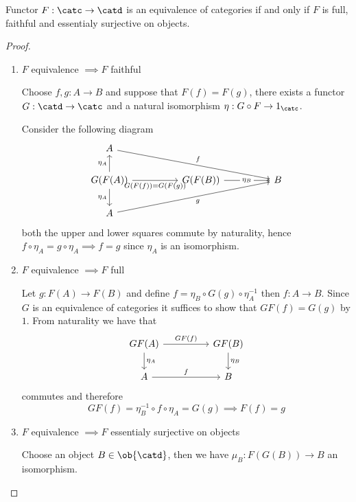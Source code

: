 \begin{proposition}
    Functor $F:\catc \to \catd$ is an equivalence of categories if and only if 
    $F$ is full, faithful and essentialy surjective on objects.
\end{proposition}
\begin{proof}[Proof]
    \begin{enumerate}
        \item $F$ equivalence $\implies F$ faithful\par
        Choose $f,g : A\to B$ and suppose that $F(f)=F(g)$, there exists a 
        functor $G: \catd \to \catc$ and a natural isomorphism $\eta: G\circ F \to 1_\catc$.\par
        Consider the following diagram 
\[\begin{tikzcd}
	A \\
	{G(F(A))} && {G(F(B))} && B \\
	A
	\arrow["f", from=1-1, to=2-5]
	\arrow["{\eta_A}", from=2-1, to=1-1]
	\arrow["{G(F(f))=G(F(g))}"', from=2-1, to=2-3]
	\arrow["{\eta_A}"', from=2-1, to=3-1]
	\arrow["{\eta_B}"{description}, from=2-3, to=2-5]
	\arrow["g"', from=3-1, to=2-5]
\end{tikzcd}\]
    both the upper and lower squares commute by naturality, hence
    $f\circ\eta_A = g\circ\eta_A \implies f=g$ since $\eta_A$ is 
    an isomorphism.
    \item $F$ equivalence $\implies F$ full\par
    Let $g: F(A)\to F(B)$ and define $f = \eta_B\circ G(g)\circ\eta_A^{-1}$
    then $f: A\to B$. Since $G$ is an equivalence of categories it suffices
    to show that $GF(f)=G(g)$ by $1$. From naturality we have that
    \[\begin{tikzcd}
	{GF(A)} && {GF(B)} \\
	A && B
	\arrow["{GF(f)}", from=1-1, to=1-3]
	\arrow["{\eta_A}", from=1-1, to=2-1]
	\arrow["f", from=2-1, to=2-3]
	\arrow["{\eta_B}", from=1-3, to=2-3]
\end{tikzcd}\]
    commutes and therefore
    \[
        GF(f) = \eta_B^{-1}\circ f \circ\eta_A = G(g) \implies F(f)=g
    \]
	\item $F$ equivalence $\implies F$ essentialy surjective on objects\par 
    Choose an object $B\in\ob{\catd}$, then we have $\mu_B : F(G(B)) \to B$ an isomorphism.


\end{enumerate}
\end{proof}

